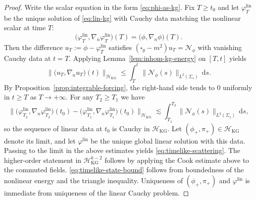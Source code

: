 \documentclass[11pt]{article}
\numberwithin{equation}{section}
\theoremstyle{plain}
\theoremstyle{definition}
\theoremstyle{remark}
\newcommand{\dd}{\mathrm{d}}
\begin{document}
\begin{proof}
Write the scalar equation in the form \eqref{eq:phi-as-kg}.
Fix $T\ge t_0$ and let $\varphi^{\mathrm{lin}}_{T}$ be the unique solution of \eqref{eq:lin-kg} with Cauchy data matching the nonlinear scalar at time $T$:
\begin{equation}
\bigl(\varphi^{\mathrm{lin}}_{T},\nabla_{n}\varphi^{\mathrm{lin}}_{T}\bigr)(T)=\bigl(\phi,\nabla_{n}\phi\bigr)(T).
\end{equation}
Then the difference $u_{T}:=\phi-\varphi^{\mathrm{lin}}_{T}$ satisfies
$(\square_g-m^{2})u_{T}=\mathcal N_{\phi}$ with vanishing Cauchy data at $t=T$.
Applying Lemma~\ref{lem:inhom-kg-energy} on $[T,t]$ yields
\begin{equation}
\|\bigl(u_{T},\nabla_{n}u_{T}\bigr)(t)\|_{\mathcal H_{\mathrm{KG}}}
\le
\int_{T}^{t}\|\mathcal N_{\phi}(s)\|_{L^{2}(\Sigma_s)}\,\dd s.
\end{equation}
By Proposition~\ref{prop:integrable-forcing}, the right-hand side tends to $0$ uniformly in $t\ge T$ as $T\to+\infty$.
For any $T_2\ge T_1$ we have
\begin{equation}
\|\bigl(\varphi^{\mathrm{lin}}_{T_2},\nabla_n\varphi^{\mathrm{lin}}_{T_2}\bigr)(t_0)-\bigl(\varphi^{\mathrm{lin}}_{T_1},\nabla_n\varphi^{\mathrm{lin}}_{T_1}\bigr)(t_0)\|_{\mathcal H_{\mathrm{KG}}}
\lesssim
\int_{T_1}^{T_2}\|\mathcal N_{\phi}(s)\|_{L^{2}(\Sigma_s)}\,\dd s,
\end{equation}
so the sequence of linear data at $t_0$ is Cauchy in $\mathcal H_{\mathrm{KG}}$.
Let $(\phi_{+},\pi_{+})\in\mathcal H_{\mathrm{KG}}$ denote its limit, and let $\varphi^{\mathrm{lin}}$ be the unique global linear solution with this data.
Passing to the limit in the above estimates yields \eqref{eq:timelike-scattering}.
The higher-order statement in $\mathcal H_{\mathrm{KG}}^{k-2}$ follows by applying the Cook estimate above to the commuted fields.
\eqref{eq:timelike-state-bound} follows from boundedness of the nonlinear energy and the triangle inequality.
Uniqueness of $(\phi_{+},\pi_{+})$ and $\varphi^{\mathrm{lin}}$ is immediate from uniqueness of the linear Cauchy problem.
\end{proof}
\end{document}
